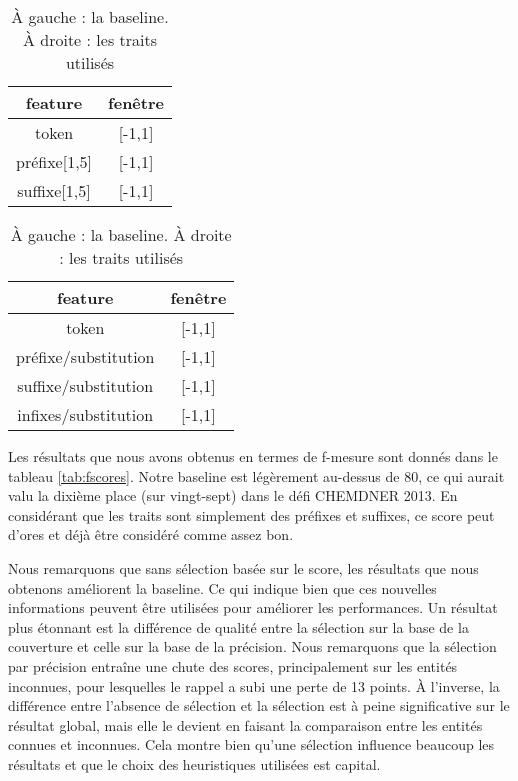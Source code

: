 \documentclass[PhD-Yoann-Dupont.tex]{subfiles}
\begin{document}
\begin{table}[ht!]
\begin{minipage}{0.45\linewidth}
\hfill
\begin{tabular}{|c|c|}
\hline
feature      & fenêtre \\
\hline
token        & [-1,1] \\
préfixe[1,5] & [-1,1] \\
suffixe[1,5] & [-1,1] \\
\hline
\end{tabular}
\end{minipage}
\begin{minipage}{0.9\linewidth}
\end{minipage}
\begin{minipage}{0.45\linewidth}
\begin{tabular}{|c|c|}
\hline
feature              & fenêtre \\
\hline
token                & [-1,1] \\
préfixe/substitution & [-1,1] \\
suffixe/substitution & [-1,1] \\
infixes/substitution & [-1,1] \\
\hline
\end{tabular}
\end{minipage}
\caption{À gauche : la baseline. À droite : les traits utilisés}
\label{tab:feature-sets}
\end{table}

Les résultats que nous avons obtenus en termes de f-mesure sont donnés dans le tableau \ref{tab:fscores}. Notre baseline est légèrement au-dessus de 80, ce qui aurait valu la dixième place (sur vingt-sept) dans le défi CHEMDNER 2013. En considérant que les traits sont simplement des préfixes et suffixes, ce score peut d'ores et déjà être considéré comme assez bon.

Nous remarquons que sans sélection basée sur le score, les résultats que nous obtenons améliorent la baseline. Ce qui indique bien que ces nouvelles informations peuvent être utilisées pour améliorer les performances. Un résultat plus étonnant est la différence de qualité entre la sélection sur la base de la couverture et celle sur la base de la précision. Nous remarquons que la sélection par précision entraîne une chute des scores, principalement sur les entités inconnues, pour lesquelles le rappel a subi une perte de 13 points. À l'inverse, la différence entre l'absence de sélection et la sélection est à peine significative sur le résultat global, mais elle le devient en faisant la comparaison entre les entités connues et inconnues. Cela montre bien qu'une sélection influence beaucoup les résultats et que le choix des heuristiques utilisées est capital.
\end{document}
